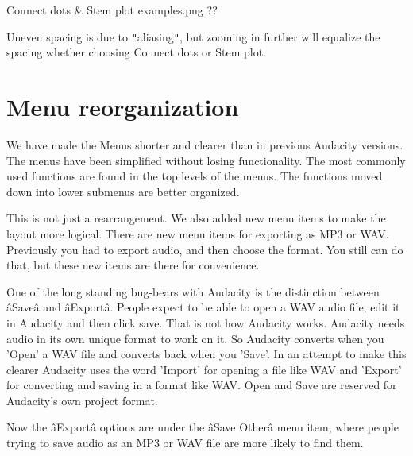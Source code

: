 Connect dots \& Stem plot examples.png
??

Uneven spacing is due to \texttt{{}"{}}aliasing\texttt{{}"{}}, but zooming in further will equalize the spacing whether choosing Connect dots or Stem plot.





\section{
Menu reorganization
}


We have made the Menus shorter and clearer than in previous Audacity versions. The menus have been simplified without losing functionality. The most commonly used functions are found in the top levels of the menus. The functions moved down into lower submenus are better organized.

This is not just a rearrangement.  We also added new menu items to make the layout more logical.  There are new menu items for exporting as MP3 or WAV. Previously you had to export audio, and then choose the format. You still can do that, but these new items are there for convenience.

One of the long standing bug-bears with Audacity is the distinction between \^aSave\^a and \^aExport\^a. People expect to be able to open a WAV audio file, edit it in Audacity and then click save. That is not how Audacity works. Audacity needs audio in its own unique format to work on it. So Audacity converts when you 'Open' a WAV file and converts back when you 'Save'. In an attempt to make this clearer Audacity uses the word 'Import' for opening a file like WAV and 'Export' for converting and saving in a format like WAV. Open and Save are reserved for Audacity's own project format.

Now the \^aExport\^a options are under the \^aSave Other\^a menu item, where people trying to save audio as an MP3 or WAV file are more likely to find them. 





